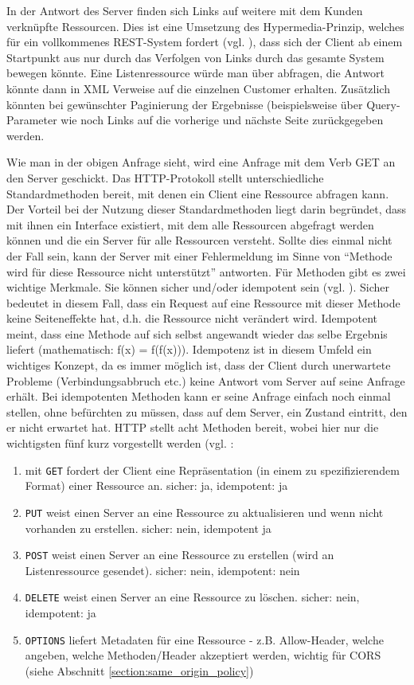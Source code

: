 In der Antwort des Server finden sich Links auf weitere mit dem Kunden verknüpfte Ressourcen. Dies ist eine Umsetzung des Hypermedia-Prinzip, welches für ein vollkommenes REST-System fordert (vgl. \cite{tilkovrestchapter2}), dass sich der Client ab einem Startpunkt aus nur durch das Verfolgen von Links durch das gesamte System bewegen könnte. Eine Listenressource würde man über  abfragen, die Antwort könnte dann in XML Verweise auf die einzelnen Customer erhalten. Zusätzlich könnten bei gewünschter Paginierung der Ergebnisse (beispielsweise über Query-Parameter wie  noch Links auf die vorherige und nächste Seite zurückgegeben werden.

Wie man in der obigen Anfrage sieht, wird eine Anfrage mit dem Verb GET an den Server geschickt. Das HTTP-Protokoll stellt unterschiedliche Standardmethoden bereit, mit denen ein Client eine Ressource abfragen kann. Der Vorteil bei der Nutzung dieser Standardmethoden liegt darin begründet, dass mit ihnen ein Interface existiert, mit dem alle Ressourcen abgefragt werden können und die ein Server für alle Ressourcen versteht. Sollte dies einmal nicht der Fall sein, kann der Server mit einer Fehlermeldung im Sinne von "`Methode wird für diese Ressource nicht unterstützt"' antworten. Für Methoden gibt es zwei wichtige Merkmale. Sie können sicher und/oder idempotent sein (vgl. \cite{tilkovrestchapter5}). Sicher bedeutet in diesem Fall, dass ein Request auf eine Ressource mit dieser Methode keine Seiteneffekte hat, d.h. die Ressource nicht verändert wird. Idempotent meint, dass eine Methode auf sich selbst angewandt wieder das selbe Ergebnis liefert (mathematisch: f(x) = f(f(x))). Idempotenz ist in diesem Umfeld ein wichtiges Konzept, da es immer möglich ist, dass der Client durch unerwartete Probleme (Verbindungsabbruch etc.) keine Antwort vom Server auf seine Anfrage erhält. Bei idempotenten Methoden kann er seine Anfrage einfach noch einmal stellen, ohne befürchten zu müssen, dass auf dem Server, ein Zustand eintritt, den er nicht erwartet hat. HTTP stellt acht Methoden bereit, wobei hier nur die wichtigsten fünf kurz vorgestellt werden (vgl. \cite{tilkovrestchapter5}:
\begin{enumerate}
 \item mit \texttt{GET} fordert der Client eine Repräsentation (in einem zu spezifizierendem Format) einer Ressource an. sicher: ja, idempotent: ja
 \item \texttt{PUT} weist einen Server an eine Ressource zu aktualisieren und wenn nicht vorhanden zu erstellen. sicher: nein, idempotent ja 
 \item \texttt{POST} weist einen Server an eine Ressource zu erstellen (wird an Listenressource gesendet). sicher: nein, idempotent: nein
 \item \texttt{DELETE} weist einen Server an eine Ressource zu löschen. sicher: nein, idempotent: ja
 \item \texttt{OPTIONS} liefert Metadaten für eine Ressource - z.B. Allow-Header, welche angeben, welche Methoden/Header akzeptiert werden, wichtig für CORS (siehe Abschnitt \ref{section:same_origin_policy})
\end{enumerate}

